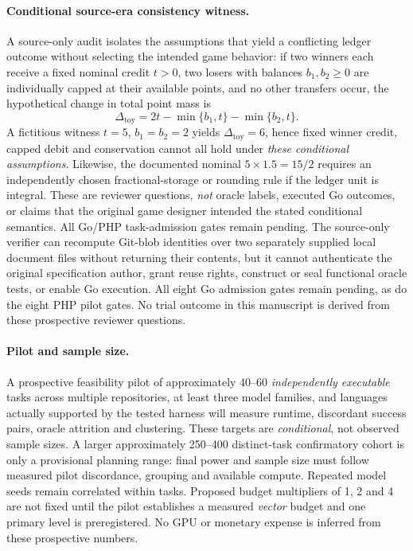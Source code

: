 \documentclass[pdflatex,sn-basic]{sn-jnl}
\begin{document}
\paragraph{Conditional source-era consistency witness.}
A source-only audit isolates the assumptions that yield
a conflicting ledger outcome without selecting the
intended game behavior: if two winners each receive
a fixed nominal credit $t>0$, two losers with balances
$b_1,b_2\geq0$ are individually capped at their available
points, and no other transfers occur, the hypothetical
change in total point mass is
\[
  \Delta_{\mathrm{toy}}=2t-\min\{b_1,t\}-\min\{b_2,t\}.
\]
A fictitious witness $t=5$, $b_1=b_2=2$ yields
$\Delta_{\mathrm{toy}}=6$, hence fixed winner credit,
capped debit and conservation cannot all hold under
\emph{these conditional assumptions}. Likewise, the
documented nominal $5\times1.5=15/2$ requires an
independently chosen fractional-storage or rounding
rule if the ledger unit is integral. These are
reviewer questions, \emph{not} oracle labels, executed
Go outcomes, or claims that the original game designer
intended the stated conditional semantics. All Go/PHP
task-admission gates remain pending. The source-only verifier can
recompute Git-blob identities over two separately supplied
local document files without returning their contents,
but it cannot authenticate the original specification
author, grant reuse rights, construct or seal functional
oracle tests, or enable Go execution. All eight Go
admission gates remain pending, as do the eight
PHP pilot gates. No trial outcome in this manuscript
is derived from these prospective reviewer questions.

\paragraph{Pilot and sample size.}
A prospective feasibility pilot of approximately 40--60
\emph{independently executable} tasks across multiple repositories,
at least three model families, and languages actually supported
by the tested harness will measure runtime, discordant success
pairs, oracle attrition and clustering. These targets are
\emph{conditional}, not observed sample sizes. A larger
approximately 250--400 distinct-task confirmatory cohort is
only a provisional planning range: final power and sample size
must follow measured pilot discordance, grouping and available
compute. Repeated model seeds remain correlated within tasks.
Proposed budget multipliers of 1, 2 and 4 are not fixed until
the pilot establishes a measured \emph{vector} budget and one
primary level is preregistered. No GPU or monetary expense is
inferred from these prospective numbers.
\end{document}
